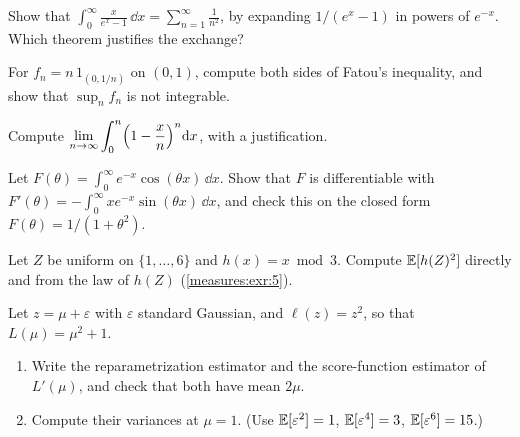 \begin{notechapter}
\begin{exercise}\label{lebesgue-integral:exr:3}
Show that
$\displaystyle\int_0^\infty\frac x{e^x - 1}\,\dd x
= \sum_{n=1}^\infty\frac1{n^2}$, by expanding $1/(e^x - 1)$ in powers of
$e^{-x}$. Which theorem justifies the exchange?
\end{exercise}

\begin{exercise}\label{lebesgue-integral:exr:4}
For $f_n = n\,1_{(0, 1/n)}$ on $(0, 1)$, compute both sides of Fatou's
inequality, and show that $\sup_nf_n$ is not integrable.
\end{exercise}

\begin{exercise}\label{lebesgue-integral:exr:5}
Compute
$\displaystyle\lim_{n\to\infty}\int_0^n\Bigl(1 - \frac xn\Bigr)^n\mathrm{d} x$,
with a justification.
\end{exercise}

\begin{exercise}\label{lebesgue-integral:exr:6}
Let $F(\theta) = \int_0^\infty e^{-x}\cos(\theta x)\,\dd x$. Show that
$F$ is differentiable with
$F'(\theta) = -\int_0^\infty xe^{-x}\sin(\theta x)\,\dd x$, and check
this on the closed form $F(\theta) = 1/(1 + \theta^2)$.
\end{exercise}

\begin{exercise}\label{lebesgue-integral:exr:7}
Let $Z$ be uniform on $\{1,\dots,6\}$ and $h(x) = x\bmod3$. Compute
$\mathbb{E}[h(Z)^2]$ directly and from the law of $h(Z)$
(\cref{measures:exr:5}).
\end{exercise}

\begin{exercise}\label{lebesgue-integral:exr:8}
Let $z = \mu + \varepsilon$ with $\varepsilon$ standard Gaussian, and
$\ell(z) = z^2$, so that $L(\mu) = \mu^2 + 1$.
\begin{enumerate}[nosep]
  \item Write the reparametrization estimator and the score-function
        estimator of $L'(\mu)$, and check that both have mean $2\mu$.
  \item Compute their variances at $\mu = 1$. (Use
        $\mathbb{E}[\varepsilon^2] = 1$, $\mathbb{E}[\varepsilon^4] = 3$,
        $\mathbb{E}[\varepsilon^6] = 15$.)
\end{enumerate}
\end{exercise}


\end{notechapter}
